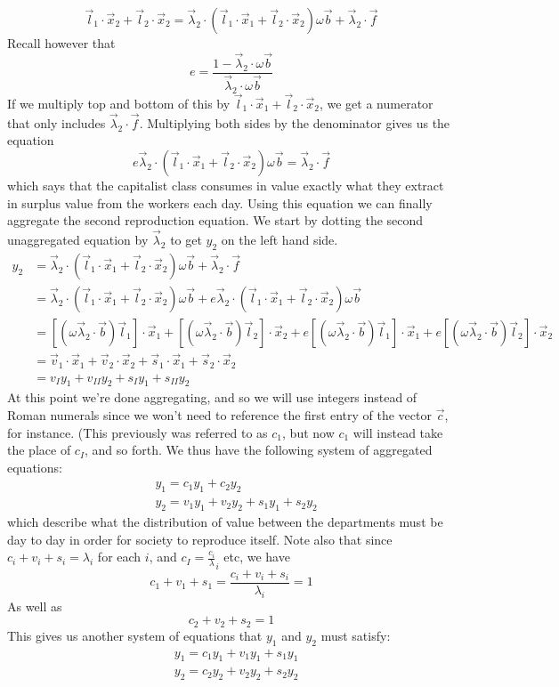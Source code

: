 \[ \vec{l}_1 \cdot \vec{x}_2 + \vec{l}_2 \cdot \vec{x}_2 = \vec{\lambda}_2 \cdot (\vec{l}_1 \cdot \vec{x}_1 + \vec{l}_2 \cdot \vec{x}_2)\omega \vec{b} + \vec{\lambda}_2 \cdot \vec{f} \]
Recall however that 
\[ e = \frac{1 - \vec{\lambda}_2 \cdot \omega \vec{b}}{\vec{\lambda}_2 \cdot \omega \vec{b}} \]
If we multiply top and bottom of this by $\vec{l}_1 \cdot \vec{x}_1 + \vec{l}_2 \cdot \vec{x}_2$, we get a numerator that only includes $\vec{\lambda}_2 \cdot \vec{f}$. Multiplying both sides by the denominator gives us the equation
\[ e\vec{\lambda}_2 \cdot (\vec{l}_1 \cdot \vec{x}_1 + \vec{l}_2 \cdot \vec{x}_2) \omega \vec{b} = \vec{\lambda}_2 \cdot \vec{f} \]
which says that the capitalist class consumes in value exactly what they extract in surplus value from the workers each day. Using this equation we can finally aggregate the second reproduction equation. We start by dotting the second unaggregated equation by $\vec{\lambda}_2$ to get $y_2$ on the left hand side. 
\begin{align*}
	y_2 &= \vec{\lambda}_2 \cdot (\vec{l}_1 \cdot \vec{x}_1 + \vec{l}_2 \cdot \vec{x}_2)\omega \vec{b} + \vec{\lambda}_2 \cdot \vec{f} \\
	&= \vec{\lambda}_2 \cdot (\vec{l}_1 \cdot \vec{x}_1 + \vec{l}_2 \cdot \vec{x}_2)\omega \vec{b} + e\vec{\lambda}_2 \cdot (\vec{l}_1 \cdot \vec{x}_1 + \vec{l}_2 \cdot \vec{x}_2) \omega \vec{b} \\
	&= [(\omega \vec{\lambda}_2 \cdot \vec{b})\vec{l}_1] \cdot \vec{x}_1 + [(\omega \vec{\lambda}_2 \cdot \vec{b}) \vec{l}_2] \cdot \vec{x}_2 + e[(\omega \vec{\lambda}_2 \cdot \vec{b})\vec{l}_1] \cdot \vec{x}_1 + e[(\omega \vec{\lambda}_2 \cdot \vec{b}) \vec{l}_2] \cdot \vec{x}_2 \\
	&= \vec{v}_1 \cdot \vec{x}_1 + \vec{v}_2 \cdot \vec{x}_2 + \vec{s}_1 \cdot \vec{x}_1 + \vec{s}_2 \cdot \vec{x}_2 \\
	&= v_I y_1 + v_{II}y_2 + s_I y_1 + s_{II} y_2
\end{align*}
At this point we're done aggregating, and so we will use integers instead of Roman numerals since we won't need to reference the first entry of the vector $\vec{c}$, for instance. (This previously was referred to as $c_1$, but now $c_1$ will instead take the place of $c_I$, and so forth. We thus have the following system of aggregated equations:
\begin{align}
	& y_1 = c_1 y_1 + c_2 y_2 \\
	& y_2 = v_1 y_1 + v_2 y_2 + s_1 y_1 + s_2 y_2
\end{align}
which describe what the distribution of value between the departments must be day to day in order for society to reproduce itself. Note also that since $c_i + v_i + s_i = \lambda_i$ for each $i$, and $c_I = \frac{c_i}{\lambda}_i$ etc, we have
\[ c_1 + v_1 + s_1 = \frac{c_i+v_i+s_i}{\lambda_i} = 1 \]
As well as
\[ c_2 + v_2 + s_2 = 1 \]
This gives us another system of equations that $y_1$ and $y_2$ must satisfy:
\begin{align}
	& y_1 = c_1y_1 + v_1 y_1 + s_1 y_1 \\
	& y_2 = c_2 y_2 + v_2 y_2 + s_2 y_2
\end{align} 
